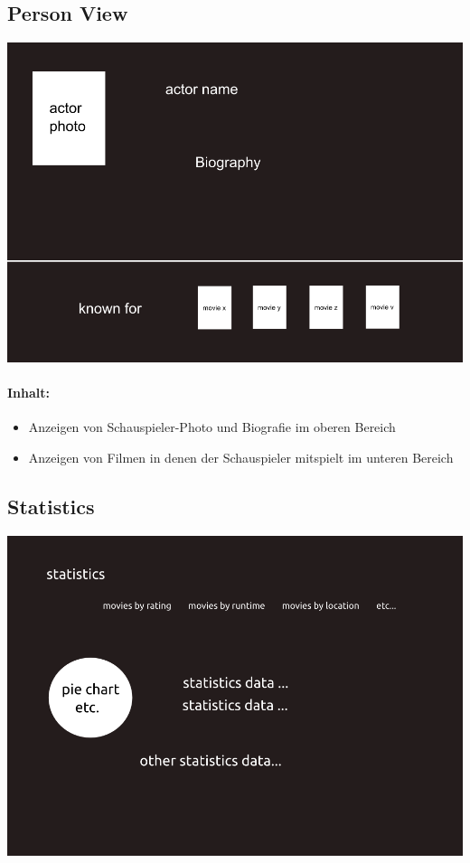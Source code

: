 \documentclass[11pt]{scrreprt}
\begin{document}
\subsection{Person View}
\includegraphics[width=\textwidth]{../pics/actorview}
\paragraph{Inhalt:}
\begin{itemize}
    \item Anzeigen von Schauspieler-Photo und Biografie im oberen Bereich
    \item Anzeigen von Filmen in denen der Schauspieler mitspielt im unteren Bereich
\end{itemize}


\subsection{Statistics}
\includegraphics[width=\textwidth]{../pics/statistics}
\end{document}
